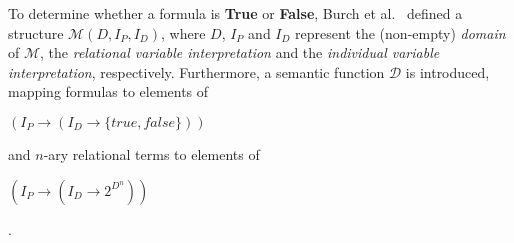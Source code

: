 \documentclass{vldb}
\begin{document}
To determine whether a formula is \textbf{True} or \textbf{False}, Burch et
al.~\cite{BURCH90} defined a structure $\mathcal{M}\left( D, I_P, I_D \right)$,
where $D$, $I_P$ and $I_D$ represent the (non-empty) \textit{domain} of
$\mathcal{M}$, the \textit{relational variable interpretation} and the
\textit{individual variable interpretation}, respectively. Furthermore, a semantic
function $\mathcal{D}$ is introduced, mapping formulas to elements of
\begin{center}
$\left( I_P \rightarrow \left( I_D \rightarrow \lbrace true, false \rbrace \right) \right)$
\end{center}
and $n$-ary relational terms to elements of
\begin{center}
$\left( I_P \rightarrow \left( I_D \rightarrow 2^{D^n} \right) \right)$
\end{center}.
\end{document}
